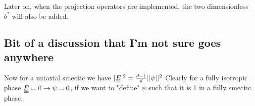 \documentclass[11pt]{article}
\begin{document}
Later on, when the projection operators are implemented, the two dimensionless $b^?$ will also be added.


\vspace{3em}
\subsection*{Bit of a discussion that I'm not sure goes anywhere}
Now for a uniaxial smectic we have $|\du{E}|^2 = \frac{d-1}{d}||\psi||^2$
Clearly for a fully isotropic phase $\du{E} = 0 \rightarrow \psi = 0$, if we want to "define" $\psi$ such that it is 1 in a fully smectic phase.
\end{document}
